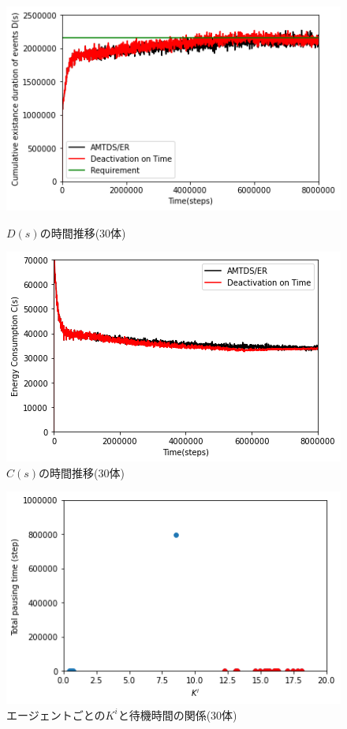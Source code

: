 \documentclass[12pt,a4j,twoside]{jarticle}
\begin{document}
  \begin{figure}
    \centering
    \includegraphics[width=0.9\hsize]{figures/ds_graph_3600_ave_TimeStop30_Office_600.png}
    \caption{$D(s)$の時間推移(30体)}
    \label{fig:ds_TimeStop30}
    \vspace{40pt}
    \centering
    \includegraphics[width=0.9\hsize]{figures/cs_graph_3600_ave_TimeStop30_Office_600.png}
    \caption{$C(s)$の時間推移(30体)}
    \label{fig:cs_TimeStop30}
  \end{figure}

  \begin{figure}
    \centering
    \includegraphics[width=0.8\hsize]{figures/CorrectionScatter_Office_TimeStop30.png}
    \caption{エージェントごとの$K^i$と待機時間の関係(30体)}
    \label{fig:cscatter_TimeStop30_Office}
  \end{figure}
\end{document}
